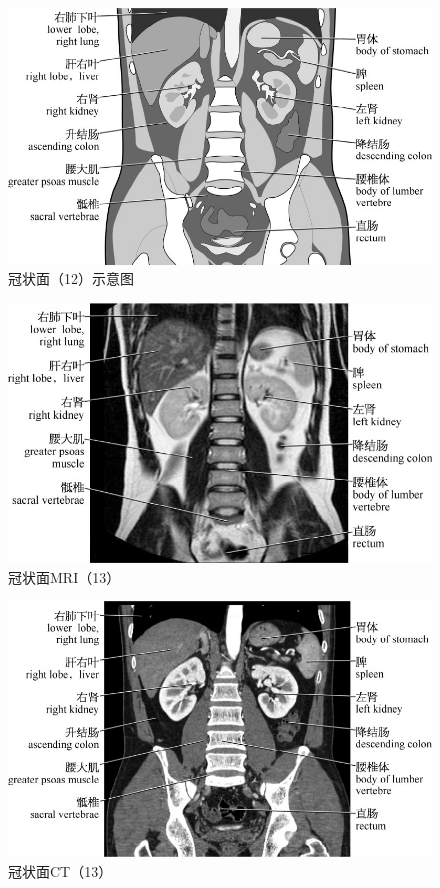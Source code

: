 \begin{figure}[!htbp]
 \centering
 \includegraphics{./images/Image00127.jpg}
 \captionsetup{justification=centering}
 \caption{冠状面（12）示意图}
  \end{figure} 
 \FloatBarrier

\begin{figure}[!htbp]
 \centering
 \includegraphics{./images/Image00128.jpg}
 \captionsetup{justification=centering}
 \caption{冠状面MRI（13）}
  \end{figure} 
 \FloatBarrier

\begin{figure}[!htbp]
 \centering
 \includegraphics{./images/Image00129.jpg}
 \captionsetup{justification=centering}
 \caption{冠状面CT（13）}
  \end{figure} 
 \FloatBarrier


